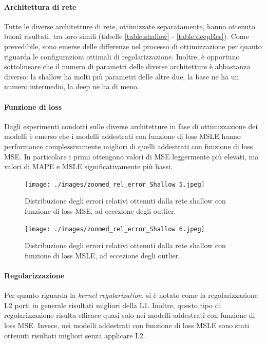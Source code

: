 \paragraph{Architettura di rete} Tutte le diverse architetture di rete, ottimizzate separatamente, 
hanno ottenuto buoni risultati, tra loro simili (tabelle \ref{table:shallow} - \ref{table:deepRes}). 
Come prevedibile, sono emerse delle differenze nel processo di ottimizzazione per quanto riguarda le 
configurazioni ottimali di regolarizzazione. Inoltre, è opportuno sottolineare che il numero di parametri 
delle diverse architetture è abbastanza diverso: la shallow ha molti più parametri delle altre due, la 
base ne ha un numero intermedio, la deep ne ha di meno.

\paragraph{Funzione di loss} Dagli esperimenti condotti sulle diverse architetture in fase
di ottimizzazione dei modelli è emerso che i modelli addestrati con funzione di loss MSLE
hanno performance complessivamente migliori di quelli addestrati con funzione di loss MSE. 
In particolare i primi ottengono valori di MSE leggermente più elevati, ma valori di MAPE e 
MSLE significativamente più bassi.

\begin{figure}[H]
	\texttt{[image: ./images/zoomed\_rel\_error\_Shallow 5.jpeg]}
	\centering
	\caption{Distribuzione degli errori relativi ottenuti dalla rete shallow con funzione di loss MSE, ad eccezione degli outlier.}
\end{figure}

\begin{figure}[H]
	\texttt{[image: ./images/zoomed\_rel\_error\_Shallow 6.jpeg]}
	\centering
	\caption{Distribuzione degli errori relativi ottenuti dalla rete shallow con funzione di loss MSLE, ad eccezione degli outlier.}
\end{figure}

\paragraph{Regolarizzazione} Per quanto riguarda la \emph{kernel regularization}, si è notato
come la regolarizzazione L2 porti in generale risultati migliori della L1. Inoltre, questo tipo
di regolarizzazione risulta efficace quasi solo nei modelli addestrati con funzione di loss MSE.
Invece, nei modelli addestrati con funzione di loss MSLE sono stati ottenuti risultati migliori
senza applicare L2.


